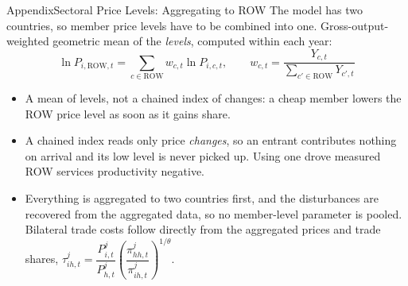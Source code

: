 \documentclass[10pt]{beamer}
\newcommand{\itms}{\itemsep5pt}
\newcommand{\apback}[1]{%
  \vfill\raggedleft\hyperlink{#1}{\structure{\tiny$\blacktriangleleft$\,back}}}
\begin{document}
\begin{frame}{Appendix}{Sectoral Price Levels: Aggregating to ROW}\label{ap:row}
  \small
  The model has two countries, so member price levels have to be combined into
  one. Gross-output-weighted geometric mean of the \emph{levels}, computed
  within each year:
  \begin{equation*}
    \ln P_{i,\text{ROW},t}=\sum_{c\in\text{ROW}}w_{c,t}\ln P_{i,c,t},
    \qquad
    w_{c,t}=\frac{Y_{c,t}}{\sum_{c'\in\text{ROW}}Y_{c',t}}
  \end{equation*}
  \begin{itemize}\itms
    \item A mean of levels, not a chained index of changes: a cheap member
          lowers the ROW price level as soon as it gains share.
    \item A chained index reads only price \emph{changes}, so an entrant
          contributes nothing on arrival and its low level is never picked up.
          Using one drove measured ROW services productivity negative.
    \item Everything is aggregated to two countries first, and the disturbances
          are recovered from the aggregated data, so no member-level parameter
          is pooled. Bilateral trade costs follow directly from the aggregated
          prices and trade shares,
          $\tau^j_{ih,t}=\dfrac{P^j_{i,t}}{P^j_{h,t}}
           \left(\dfrac{\pi^j_{hh,t}}{\pi^j_{ih,t}}\right)^{1/\theta}$.
  \end{itemize}
  \apback{fr:data}
\end{frame}
\end{document}
